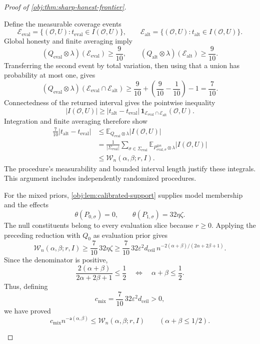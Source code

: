 \begin{proof}[Proof of \cref{obj:thm:sharp-honest-frontier}]
\begin{enumerate}
Define the measurable coverage events
\[
\mathcal E_{\mathrm{eval}}
=\{(\mathcal O,U):t_{\mathrm{eval}}\in I(\mathcal O,U)\},
\qquad
\mathcal E_{\mathrm{alt}}
=\{(\mathcal O,U):t_{\mathrm{alt}}\in I(\mathcal O,U)\}.
\]
Global honesty and finite averaging imply
\[
(Q_{\mathrm{eval}}\otimes\lambda)(\mathcal E_{\mathrm{eval}})\ge\frac9{10},
\qquad
(Q_{\mathrm{alt}}\otimes\lambda)(\mathcal E_{\mathrm{alt}})\ge\frac9{10}.
\]
Transferring the second event by total variation, then using that a union has
probability at most one, gives
\[
(Q_{\mathrm{eval}}\otimes\lambda)
(\mathcal E_{\mathrm{eval}}\cap\mathcal E_{\mathrm{alt}})
\ge\frac9{10}+\left(\frac9{10}-\frac1{10}\right)-1
=\frac7{10}.
\]
Connectedness of the returned interval gives the pointwise inequality
\[
|I(\mathcal O,U)|
\ge
|t_{\mathrm{alt}}-t_{\mathrm{eval}}|\,
\mathbf1_{\mathcal E_{\mathrm{eval}}\cap\mathcal E_{\mathrm{alt}}}
(\mathcal O,U).
\]
Integration and finite averaging therefore show
\[
\begin{aligned}
\frac7{10}|t_{\mathrm{alt}}-t_{\mathrm{eval}}|
&\le
\mathbb E_{Q_{\mathrm{eval}}\otimes\lambda}|I(\mathcal O,U)|\\
&=
\frac1{|\Sigma_{\mathrm{eval}}|}
\sum_{\sigma\in\Sigma_{\mathrm{eval}}}
\mathbb E_{P_{\mathrm{eval},\sigma}^{\otimes n}\otimes\lambda}
|I(\mathcal O,U)|\\
&\le\mathcal W_n(\alpha,\beta;r,I).
\end{aligned}
\]
The procedure's measurability and bounded interval length justify these
integrals. This argument includes independently randomized procedures.

For the mixed priors, \cref{obj:lem:calibrated-support} supplies model
membership and the effects
\[
\theta(P_{0,\sigma})=0,\qquad
\theta(P_{1,\sigma})=32\eta\zeta.
\]
The null constituents belong to every evaluation slice because \(r\ge0\).
Applying the preceding reduction with \(Q_0\) as evaluation prior gives
\[
\mathcal W_n(\alpha,\beta;r,I)
\ge\frac7{10}\,32\eta\zeta
\ge
\frac7{10}\,32\varepsilon^2d_{\mathrm{ceil}}\,
n^{-2(\alpha+\beta)/(2\alpha+2\beta+1)}.
\]
Since the denominator is positive,
\[
\frac{2(\alpha+\beta)}{2\alpha+2\beta+1}\le\frac12
\quad\Longleftrightarrow\quad
\alpha+\beta\le\frac12.
\]
Thus, defining
\[
c_{\mathrm{mix}}=\frac7{10}\,32\varepsilon^2d_{\mathrm{ceil}}>0,
\]
we have proved
\[
c_{\mathrm{mix}}n^{-\mathsf a(\alpha,\beta)}
\le\mathcal W_n(\alpha,\beta;r,I)
\qquad(\alpha+\beta\le1/2).
\]


\end{enumerate}
\end{proof}
